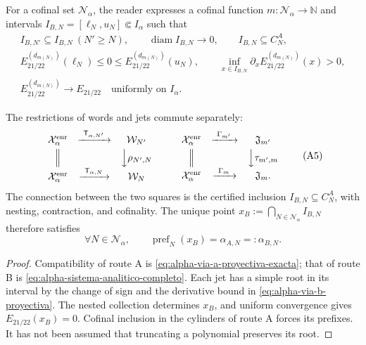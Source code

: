 For a cofinal set \(\mathcal N_\alpha\), the reader expresses a cofinal
function \(m:\mathcal N_\alpha\to\mathbb N\) and intervals
\(I_{B,N}=[\ell_N,u_N]\Subset I_\alpha\) such that
\begin{equation}
\begin{gathered}
 I_{B,N'}\subseteq I_{B,N}\ (N'\ge N),\qquad
 \operatorname{diam}I_{B,N}\longrightarrow0,\qquad
 I_{B,N}\subseteq C_N^A,\\
 E_{21/22}^{(d_{m(N)})}(\ell_N)\le0\le
 E_{21/22}^{(d_{m(N)})}(u_N),\qquad
 \inf_{x\in I_{B,N}}\partial_xE_{21/22}^{(d_{m(N)})}(x)>0,\\
 E_{21/22}^{(d_{m(N)})}\longrightarrow E_{21/22}
 \quad\text{uniformly on }I_\alpha .
\end{gathered}
 \tag{A4}
 \label{eq:alpha-via-b-proyectiva}
\end{equation}

\begin{proposition}
\label{prop:alpha-cuadrados-compatibilidad-historico-rev04}
The restrictions of words and jets commute separately:
\[
\begin{array}{ccc}
 \mathcal X_\alpha^{\mathrm{enr}}&
 \xrightarrow{\ \mathsf T_{\alpha,N'}\ }&\mathcal W_{N'}\\[1mm]
 \Big\Vert&&\Big\downarrow\rho_{N',N}\\[1mm]
 \mathcal X_\alpha^{\mathrm{enr}}&
 \xrightarrow{\ \mathsf T_{\alpha,N}\ }&\mathcal W_N
\end{array}
\qquad
\begin{array}{ccc}
 \mathcal X_\alpha^{\mathrm{enr}}&
 \xrightarrow{\ \Gamma_{m'}\ }&\mathfrak J_{m'}\\[1mm]
 \Big\Vert&&\Big\downarrow\tau_{m',m}\\[1mm]
 \mathcal X_\alpha^{\mathrm{enr}}&
 \xrightarrow{\ \Gamma_m\ }&\mathfrak J_m .
\end{array}
 \tag{A5}
\]
The connection between the two squares is the certified inclusion
\(I_{B,N}\subseteq C_N^A\), with nesting, contraction, and cofinality.
The unique point
\(x_B:=\bigcap_{N\in\mathcal N_\alpha}I_{B,N}\) therefore satisfies
\begin{equation}
 \forall N\in\mathcal N_\alpha,\qquad
 \operatorname{pref}_N(x_B)=\alpha_{A,N}=:\alpha_{B,N}.
 \tag{A6}
 \label{eq:alpha-igualdad-cada-nivel}
\end{equation}
\end{proposition}

\begin{proof}
Compatibility of route A is
\eqref{eq:alpha-via-a-proyectiva-exacta}; that of route B is
\eqref{eq:alpha-sistema-analitico-completo}. Each jet has a simple root
in its interval by the change of sign and the derivative bound in
\eqref{eq:alpha-via-b-proyectiva}. The nested collection determines \(x_B\), and
uniform convergence gives \(E_{21/22}(x_B)=0\). Cofinal inclusion in the
cylinders of route A forces its prefixes. It has not been assumed that
truncating a polynomial preserves its root.
\end{proof}

